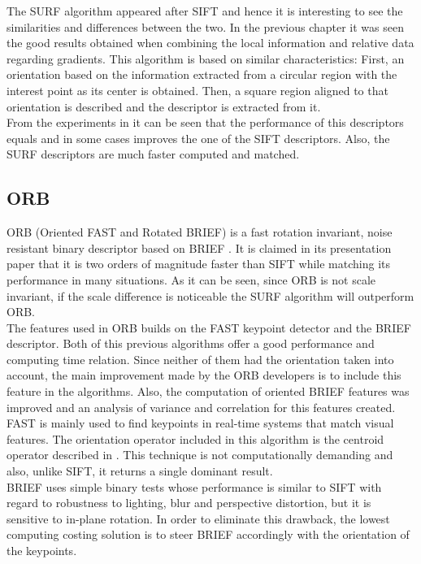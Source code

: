 The SURF algorithm appeared after SIFT and hence it is interesting to see the similarities and differences between the two. In the previous chapter it was seen the good results obtained when combining the local information and relative data regarding gradients. This algorithm is based on similar characteristics: 
First, an orientation based on the information extracted from a circular region with the interest point as its center is obtained. Then, a square region aligned to that orientation is described and the descriptor is extracted from it.  
\\

From the experiments in \cite{surf} it can be seen that the performance of this descriptors equals and in some cases improves the one of the SIFT descriptors. Also, the SURF descriptors are much faster computed and matched. 


\subsection{ORB}
ORB (Oriented FAST and Rotated BRIEF) is a fast rotation invariant, noise resistant binary descriptor based on BRIEF \cite{orb}.
It is claimed in its presentation paper that it is two orders of magnitude faster than SIFT while matching its performance in many situations. As it can be seen, since ORB is not scale invariant, if the scale difference is noticeable the SURF algorithm will outperform ORB. 
\\

The features used in ORB builds on the FAST\cite{fast} keypoint detector and the BRIEF\cite{brief} descriptor. Both of this previous algorithms offer a good performance and computing time relation. Since neither of them had the orientation taken into account, the main improvement made by the ORB developers is to include this feature in the algorithms. Also, the computation of oriented BRIEF features was improved and an analysis of variance and correlation for this features created. 
\\

FAST is mainly used to find keypoints in real-time systems that match visual features. The orientation operator included in this algorithm is the centroid operator described in \cite{orientation_corners}. This technique is not computationally demanding and also, unlike SIFT, it returns a single dominant result. 
\\

BRIEF uses simple binary tests whose performance is similar to SIFT with regard to robustness to lighting, blur and perspective distortion, but it is sensitive to in-plane rotation. In order to eliminate this drawback, the lowest computing costing solution is to steer BRIEF accordingly with the orientation of the keypoints. 
\\


